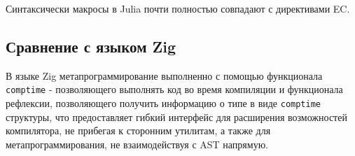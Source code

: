 Синтаксически макросы в Julia почти полностью совпадают с директивами EC.

\subsection{Сравнение с языком Zig}
В языке Zig метапрограммирование выполненно с помощью функционала \verb|comptime| - позволяющего выполнять код во время компиляции и функционала рефлексии, 
позволяющего получить информацию о типе в виде \verb|comptime| структуры, что предоставляет гибкий интерфейс для расширения возможностей компилятора, не прибегая 
к сторонним утилитам, а также для метапрограммирования, не взаимодействуя с AST напрямую.